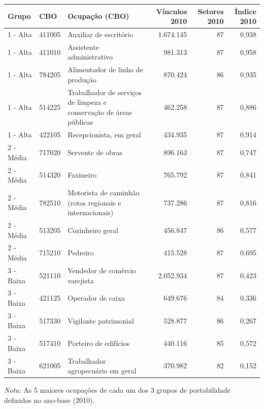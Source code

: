 \providecommand{\toprule}{\hline\hline}
\providecommand{\midrule}{\hline}
\providecommand{\bottomrule}{\hline\hline}
\providecommand{\addlinespace}[1][]{}
{\small
\renewcommand{\arraystretch}{1.12}
\begin{tabular}{llp{5.5cm}rrr}
\toprule
Grupo & CBO & Ocupação (CBO) & Vínculos 2010 & Setores 2010 & Índice 2010 \\
\midrule
1 - Alta & 411005 & Auxiliar de escritório & 1.674.145 & 87 & 0,938 \\
1 - Alta & 411010 & Assistente administrativo & 981.313 & 87 & 0,958 \\
1 - Alta & 784205 & Alimentador de linha de produção & 870.424 & 86 & 0,935 \\
1 - Alta & 514225 & Trabalhador de serviços de limpeza e conservação de áreas públicas & 462.258 & 87 & 0,886 \\
1 - Alta & 422105 & Recepcionista, em geral & 434.935 & 87 & 0,914 \\
\addlinespace[3pt]
2 - Média & 717020 & Servente de obras & 896.163 & 87 & 0,747 \\
2 - Média & 514320 & Faxineiro & 765.792 & 87 & 0,841 \\
2 - Média & 782510 & Motorista de caminhão (rotas regionais e internacionais) & 737.286 & 87 & 0,816 \\
2 - Média & 513205 & Cozinheiro geral & 456.847 & 86 & 0,577 \\
2 - Média & 715210 & Pedreiro & 415.528 & 87 & 0,695 \\
\addlinespace[3pt]
3 - Baixa & 521110 & Vendedor de comércio varejista & 2.052.934 & 87 & 0,423 \\
3 - Baixa & 421125 & Operador de caixa & 649.676 & 84 & 0,336 \\
3 - Baixa & 517330 & Vigilante patrimonial & 528.877 & 86 & 0,267 \\
3 - Baixa & 517410 & Porteiro de edifícios & 440.116 & 85 & 0,572 \\
3 - Baixa & 621005 & Trabalhador agropecuário em geral & 370.982 & 82 & 0,152 \\
\bottomrule
\end{tabular}
\vspace{2pt}
\par{\footnotesize \textit{Nota:} As 5 maiores ocupações de cada um dos 3 grupos de portabilidade definidos no ano-base (2010).}
}
